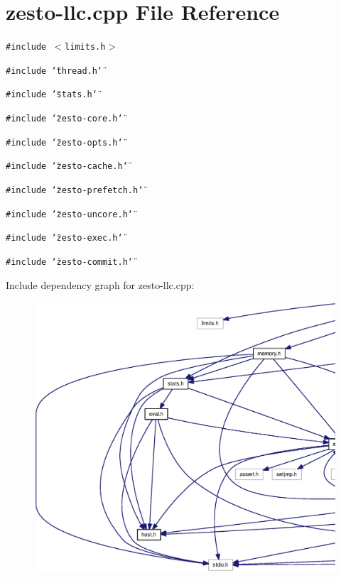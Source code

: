 \section{zesto-llc.cpp File Reference}
\label{zesto-llc_8cpp}
{\tt \#include $<$limits.h$>$}\par
{\tt \#include \char`\"{}thread.h\char`\"{}}\par
{\tt \#include \char`\"{}stats.h\char`\"{}}\par
{\tt \#include \char`\"{}zesto-core.h\char`\"{}}\par
{\tt \#include \char`\"{}zesto-opts.h\char`\"{}}\par
{\tt \#include \char`\"{}zesto-cache.h\char`\"{}}\par
{\tt \#include \char`\"{}zesto-prefetch.h\char`\"{}}\par
{\tt \#include \char`\"{}zesto-uncore.h\char`\"{}}\par
{\tt \#include \char`\"{}zesto-exec.h\char`\"{}}\par
{\tt \#include \char`\"{}zesto-commit.h\char`\"{}}\par


Include dependency graph for zesto-llc.cpp:\nopagebreak
\begin{figure}[H]
\begin{center}
\leavevmode
\includegraphics[width=420pt]{zesto-llc_8cpp__incl}
\end{center}
\end{figure}

